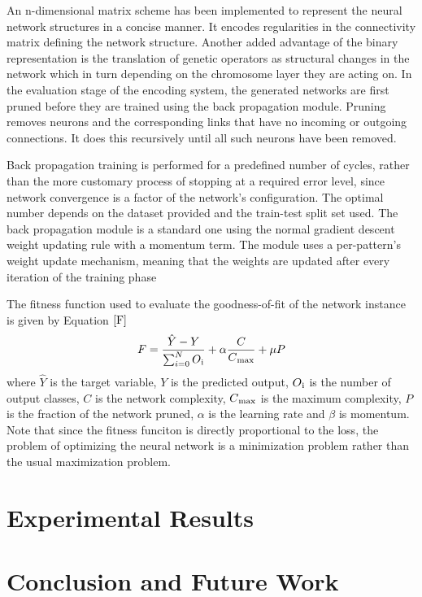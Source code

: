\documentclass[conference]{IEEEtran}
\begin{document}
An n-dimensional matrix scheme has been implemented to represent the neural network structures in a concise manner. It encodes regularities in the connectivity matrix defining the network structure. Another added advantage of the binary representation is the translation of genetic operators as structural changes in the network which in turn depending on the chromosome layer they are acting on. In the evaluation stage of the encoding system, the generated networks are first pruned before they are trained using the back propagation module. Pruning removes neurons and the corresponding links that have no incoming or outgoing connections. It does this recursively until all such neurons have been removed.

Back propagation training is performed for a predefined number of cycles, rather than the more customary process of stopping at a required error level, since network convergence is a factor of the network's configuration. The optimal number depends on the dataset provided and the train-test split set used. The back propagation module is a standard one using the normal gradient descent weight updating rule with a momentum term. The module uses a per-pattern's weight update mechanism, meaning that the weights are updated after every iteration of the training phase

The fitness function used to evaluate the goodness-of-fit of the network instance is given by Equation $\ref{F}$ 
\begin{equation}
F = \frac{\hat{Y}-Y}{\sum_{i=0}^{N}O\textsubscript{i}} + \alpha\frac{C}{C\textsubscript{max}} + \mu P
\label{F}
\end{equation}
where $\hat{Y}$ is the target variable, $Y$ is the predicted output, $O\textsubscript{i}$ is the number of output classes, $C$ is the network complexity, $C\textsubscript{max}$ is the maximum complexity, $P$ is the fraction of the network pruned, $\alpha$ is the learning rate and $\beta$ is momentum.  Note that since the fitness funciton is directly proportional to the loss, the problem of optimizing the neural network is a minimization problem rather than the usual maximization problem. 


\section{Experimental Results}

\section{Conclusion and Future Work}
\end{document}
